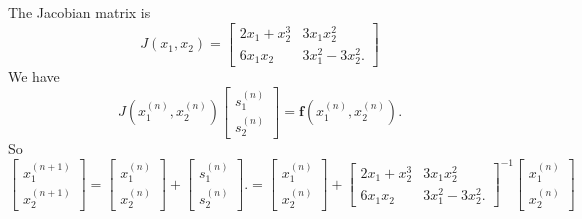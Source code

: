 \documentclass[a4paper]{book}
\makeatletter
\newenvironment{sol}[1][\solname]{\par
  \pushQED{\qed}
  \normalfont \topsep6\p@\@plus6\p@\relax
  \trivlist
  \item[\hskip\labelsep
        \itshape
    #1\@addpunct{.}]\ignorespaces
}{\popQED\endtrivlist\@endpefalse}
\providecommand{\solname}{Solution}
\numberwithin{equation}{chapter}
\theoremstyle{definition}
\makeatother
\begin{document}
  \begin{sol}
    The Jacobian matrix is 
    \begin{displaymath}
      J(x_1, x_2) =
      \begin{bmatrix}
        2x_1 + x_2^3 & 3x_1x_2^2 \\
        6x_1x_2 & 3x_1^2 - 3x_2^2.
      \end{bmatrix}
    \end{displaymath}
    We have
      \begin{displaymath}
        J(x_1^{(n)}, x_2^{(n)})
        \begin{bmatrix}
          s_1^{(n)} \\
          s_2^{(n)}
        \end{bmatrix}
        = \mathbf{f}(x_1^{(n)}, x_2^{(n)}).
      \end{displaymath}
      So
      \begin{displaymath}
        \begin{bmatrix}
          x_1^{(n+1)} \\
          x_2^{(n+1)}
        \end{bmatrix}
        =
        \begin{bmatrix}
          x_1^{(n)} \\
          x_2^{(n)}
        \end{bmatrix}
        +
        \begin{bmatrix}
          s_1^{(n)} \\
          s_2^{(n)}
        \end{bmatrix}.
        =
        \begin{bmatrix}
            x_1^{(n)} \\
            x_2^{(n)}
          \end{bmatrix}
          +
          \begin{bmatrix}
            2x_1 + x_2^3 & 3x_1x_2^2 \\
            6x_1x_2 & 3x_1^2 - 3x_2^2.
          \end{bmatrix}^{-1}
          \begin{bmatrix}
            x_1^{(n)} \\
            x_2^{(n)}
          \end{bmatrix}
      \end{displaymath}
  \end{sol}
\end{document}
